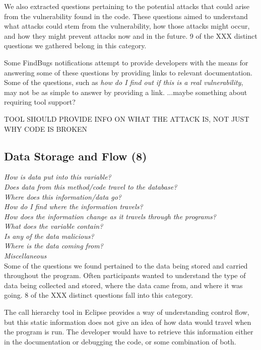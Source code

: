 \documentclass[conference]{IEEEtran}
\begin{document}
We also extracted questions pertaining to the potential attacks that could arise from the vulnerability found in the code. These questions aimed to understand what attacks could stem from the vulnerability, how those attacks might occur, and how they might prevent attacks now and in the future. 9 of the XXX distinct questions we gathered belong in this category.

Some FindBugs notifications attempt to provide developers with the means for answering some of these questions by providing links to relevant documentation. Some of the questions, such as \emph{how do I find out if this is a real vulnerability}, may not be as simple to answer by providing a link. ...maybe something about requiring tool support?

TOOL SHOULD PROVIDE INFO ON WHAT THE ATTACK IS, NOT JUST WHY CODE IS BROKEN


\noindent\subsection{\textbf{Data Storage and Flow (8)}}

\noindent\emph{How is data put into this variable?} \\
\emph{Does data from this method/code travel to the database?} \\
\emph{Where does this information/data go?} \\
\emph{How do I find where the information travels?} \\
\emph{How does the information change as it travels through the programs?} \\
\emph{What does the variable contain?} \\
\emph{Is any of the data malicious?} \\
\emph{Where is the data coming from?} \\
\emph{Miscellaneous} \\

Some of the questions we found pertained to the data being stored and carried throughout the program. Often participants wanted to understand  the type of data being collected and stored, where the data came from, and where it was going. 8 of the XXX distinct questions fall into this category.

The call hierarchy tool in Eclipse provides a way of understanding control flow, but this static information does not give an idea of how data would travel when the program is run. The developer would have to retrieve this information either in the documentation or debugging the code, or some combination of both.
\end{document}
